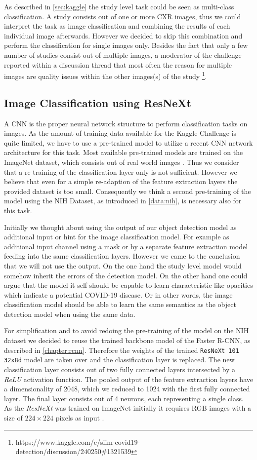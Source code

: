 As described in \ref{sec:kaggle} the study level task could be seen as multi-class classification. A study consists out of one or more \ac{CXR} images, thus we could interpret the task as image classification and combining the results of each individual image afterwards. However we decided to skip this combination and perform the classification for single images only. Besides the fact that only a few number of studies consist out of multiple images, a moderator of the challenge reported within a discussion thread that most often the reason for multiple images are quality issues within the other images(s) of the study \footnote{https://www.kaggle.com/c/siim-covid19-detection/discussion/240250\#1321539}.
\subsection*{Image Classification using ResNeXt}
A \ac{CNN} is the proper neural network structure to perform classification tasks on images. As the amount of training data available for the Kaggle Challenge is quite limited, we have to use a pre-trained model to utilize a recent CNN network architecture for this task. Most available pre-trained models are trained on the ImageNet dataset, which consists out of real world images \autocite{deng_imagenet_2009}. Thus we consider that a re-training of the classification layer only is not sufficient. However we believe that even for a simple re-adaption of the feature extraction layers the provided dataset is too small. Consequently we think a second pre-training of the model using the NIH Dataset, as introduced in \ref{data:nih}, is necessary also for this task.

Initially we thought about using the output of our object detection model as additional input or hint for the image classification model. For example as additional input channel using a mask or by a separate feature extraction model feeding into the same classification layers. However we came to the conclusion that we will not use the output. On the one hand the study level model would somehow inherit the errors of the detection model. On the other hand one could argue that the model it self should be capable to learn characteristic like opacities which indicate a potential COVID-19 disease. Or in other words, the image classification model should be able to learn the same semantics as the object detection model when using the same data.

For simplification and to avoid redoing the pre-training of the model on the NIH dataset we decided to reuse the trained backbone model of the Faster R-CNN, as described in \ref{chapter:rcnn}. Therefore the weights of the trained \texttt{ResNeXt 101 32x8d} model are taken over and the classification layer is replaced. The new classification layer consists out of two fully connected layers intersected by a \textit{ReLU} activation function. The pooled output of the feature extraction layers have a dimensionality of 2048, which we reduced to 1024 with the first fully connected layer. The final layer consists out of 4 neurons, each representing a single class. As the \textit{ResNeXt} was trained on ImageNet initially it requires RGB images with a size of $224 \times 224$ pixels as input \autocite{xie_aggregated_2017}. 

